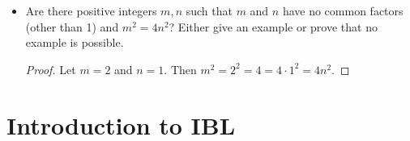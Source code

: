 \documentclass[titlepage]{article}
\begin{document}
\begin{itemize}
\begin{proof}
    \end{proof}
    \item Are there positive integers $m,n$ such that $m$ and $n$ have no common factors (other than 1) and $m^2=4n^2$? Either give an example or prove that no example is possible.
    \begin{proof}
        Let $m=2$ and $n=1$. Then $m^2=2^2=4=4\cdot 1^2=4n^2$.
    \end{proof}
\end{itemize}





\section{Introduction to IBL}
\end{document}
